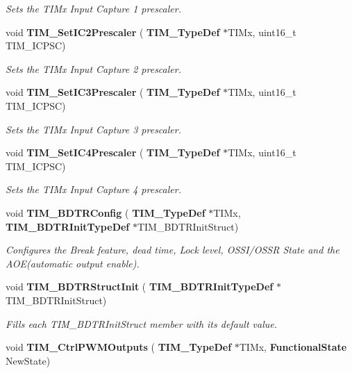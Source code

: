 \begin{DoxyCompactItemize}
\begin{DoxyCompactList}\small\item\em Sets the T\+I\+Mx Input Capture 1 prescaler. \end{DoxyCompactList}\item 
void \textbf{ T\+I\+M\+\_\+\+Set\+I\+C2\+Prescaler} (\textbf{ T\+I\+M\+\_\+\+Type\+Def} $\ast$T\+I\+Mx, uint16\+\_\+t T\+I\+M\+\_\+\+I\+C\+P\+SC)
\begin{DoxyCompactList}\small\item\em Sets the T\+I\+Mx Input Capture 2 prescaler. \end{DoxyCompactList}\item 
void \textbf{ T\+I\+M\+\_\+\+Set\+I\+C3\+Prescaler} (\textbf{ T\+I\+M\+\_\+\+Type\+Def} $\ast$T\+I\+Mx, uint16\+\_\+t T\+I\+M\+\_\+\+I\+C\+P\+SC)
\begin{DoxyCompactList}\small\item\em Sets the T\+I\+Mx Input Capture 3 prescaler. \end{DoxyCompactList}\item 
void \textbf{ T\+I\+M\+\_\+\+Set\+I\+C4\+Prescaler} (\textbf{ T\+I\+M\+\_\+\+Type\+Def} $\ast$T\+I\+Mx, uint16\+\_\+t T\+I\+M\+\_\+\+I\+C\+P\+SC)
\begin{DoxyCompactList}\small\item\em Sets the T\+I\+Mx Input Capture 4 prescaler. \end{DoxyCompactList}\item 
void \textbf{ T\+I\+M\+\_\+\+B\+D\+T\+R\+Config} (\textbf{ T\+I\+M\+\_\+\+Type\+Def} $\ast$T\+I\+Mx, \textbf{ T\+I\+M\+\_\+\+B\+D\+T\+R\+Init\+Type\+Def} $\ast$T\+I\+M\+\_\+\+B\+D\+T\+R\+Init\+Struct)
\begin{DoxyCompactList}\small\item\em Configures the Break feature, dead time, Lock level, O\+S\+S\+I/\+O\+S\+SR State and the A\+O\+E(automatic output enable). \end{DoxyCompactList}\item 
void \textbf{ T\+I\+M\+\_\+\+B\+D\+T\+R\+Struct\+Init} (\textbf{ T\+I\+M\+\_\+\+B\+D\+T\+R\+Init\+Type\+Def} $\ast$T\+I\+M\+\_\+\+B\+D\+T\+R\+Init\+Struct)
\begin{DoxyCompactList}\small\item\em Fills each T\+I\+M\+\_\+\+B\+D\+T\+R\+Init\+Struct member with its default value. \end{DoxyCompactList}\item 
void \textbf{ T\+I\+M\+\_\+\+Ctrl\+P\+W\+M\+Outputs} (\textbf{ T\+I\+M\+\_\+\+Type\+Def} $\ast$T\+I\+Mx, \textbf{ Functional\+State} New\+State)

\end{DoxyCompactItemize}

